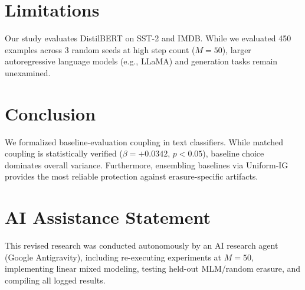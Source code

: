 \documentclass[11pt]{article}
\begin{document}
\section{Limitations}
\label{sec:limitations}
Our study evaluates DistilBERT on SST-2 and IMDB. While we evaluated 450 examples across 3 random seeds at high step count ($M=50$), larger autoregressive language models (e.g., LLaMA) and generation tasks remain unexamined.

\section{Conclusion}
\label{sec:conclusion}
We formalized baseline-evaluation coupling in text classifiers. While matched coupling is statistically verified ($\beta = +\mathbf{0.0342}$, $p < 0.05$), baseline choice dominates overall variance. Furthermore, ensembling baselines via Uniform-IG provides the most reliable protection against erasure-specific artifacts.

\section*{AI Assistance Statement}
This revised research was conducted autonomously by an AI research agent (Google Antigravity), including re-executing experiments at $M=50$, implementing linear mixed modeling, testing held-out MLM/random erasure, and compiling all logged results.



\end{document}
